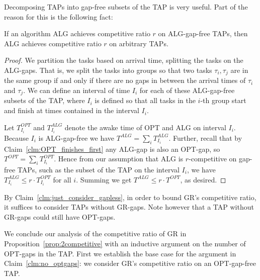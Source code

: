 Decomposing TAPs into gap-free subsets of the TAP is very useful.
Part of the reason for this is the following fact:
\begin{claim}
  \label{clm:just_consider_gapless}
  If an algorithm ALG achieves competitive ratio $r$ on
  ALG-gap-free TAPs, then ALG achieves 
  competitive ratio $r$ on arbitrary TAPs.
\end{claim}
\begin{proof}
  We partition the tasks based on arrival time, splitting the
  tasks on the ALG-gaps. That is, we split the tasks into groups
  so that two tasks $\tau_i, \tau_j$ are in the same group if and
  only if there are no gaps in between the arrival times of
  $\tau_i$ and $\tau_j$.
  We can define an interval of time $I_i$ for each of these
  ALG-gap-free subsets of the TAP, where $I_i$ is defined so that
  all tasks in the $i$-th group start and finish at times
  contained in the interval $I_i$.

  Let $T_{I_i}^{OPT}$ and $T_{I_i}^{ALG}$ denote the awake time
  of OPT and ALG on interval $I_i$. Because $I_i$ is ALG-gap-free
  we have $T^{ALG} = \sum_{i} T^{ALG}_{I_i}$.
  Further, recall that by Claim~\ref{clm:OPT_finishes_first} any
  ALG-gap is also an OPT-gap, so
  $T^{OPT} = \sum_{i} T_{I_i}^{OPT}$. 
  Hence from our assumption that ALG is $r$-competitive on
  gap-free TAPs, such as the subset of the TAP on the interval
  $I_i$, we have $T_{I_i}^{ALG} \le r\cdot T_{I_i}^{OPT}$ for
  all $i$. Summing we get $T^{ALG} \le r\cdot T^{OPT}$, as desired.
  
\end{proof}

By Claim~\ref{clm:just_consider_gapless}, in order to bound GR's
competitive ratio, it suffices to consider TAPs
without GR-gaps. Note however that a TAP without
GR-gaps could still have OPT-gaps.

We conclude our analysis of the competitive ratio of GR in
Proposition~\ref{prop:2competitive} with an inductive argument on
the number of OPT-gaps in the TAP.
First we establish the base case for the argument in
Claim~\ref{clm:no_optgaps}: we consider
GR's competitive ratio on an OPT-gap-free TAP.  

